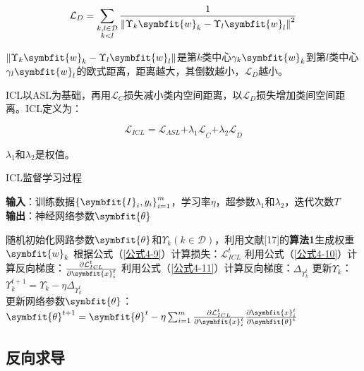 \begin{equation}\label{公式4-8}
	\mathcal{L}_{D}=\sum_{\substack{k, l \in \mathcal{D} \\ k<l}} \frac{1}{\left\|\Upsilon_{k} \symbfit{w}_{k}-\Upsilon_{l} \symbfit{w}_{l}\right\|^{2}}
\end{equation}

$\left\|\Upsilon_{k} \symbfit{w}_{k}-\Upsilon_{l} \symbfit{w}_{l}\right\|$是第$k$类中心$\gamma_{k} \symbfit{w}_{k}$到第$l$类中心$\gamma_{l} \symbfit{w}_{l}$的欧式距离，距离越大，其倒数越小，$\mathcal{L}_D$越小。


ICL以ASL为基础，再用$\mathcal{L}_C$损失减小类内空间距离，以$\mathcal{L}_D$损失增加类间空间距离。ICL定义为：

\begin{equation}\label{公式4-9}
	\mathcal{L}_{ICL}=\mathcal{L}_{ASL}{+\lambda_1\mathcal{L}}_C{+\lambda_2\mathcal{L}}_D
\end{equation}

$\lambda_1$和$\lambda_2$是权值。

\begin{algorithm}
	\caption{ICL监督学习过程}\label{algorithm}
	\textbf{输入}：训练数据$\left\{\symbfit{I}_i,y_i\right\}_{i=1}^m$，学习率$\eta$，超参数$\lambda_1$和$\lambda_2$，迭代次数$T$ \\		
	\textbf{输出}：神经网络参数$\symbfit{\theta}$ 
	\begin{algorithmic}[1]
		\State 随机初始化网路参数$\symbfit{\theta}$和$\Upsilon_k\left(k\in\mathcal{D}\right)$，利用文献[17]的\textbf{算法1}生成权重$\symbfit{w}_k$ 		
		\State 根据公式（\ref{公式4-9}）计算损失：$\mathcal{L}_{ICL}^t$ 		
		\State 利用公式（\ref{公式4-10}）计算反向梯度：$\frac{\partial\mathcal{L}_{ICL}^t}{\partial\symbfit{x}_i^t}$ 
		\State 利用公式（\ref{公式4-11}）计算反向梯度：$ \Delta_{\Upsilon_{k}^{t}} $
		\State 更新$\Upsilon_k$：
		$ 
		\Upsilon_{k}^{t+1}=\Upsilon_{k}-\eta \Delta_{\Upsilon_{k}^{t}}
		$		\\
		\State 更新网络参数$\symbfit{\theta}$：
		$\symbfit{\theta}^{t+1}=\symbfit{\theta}^t-\eta\sum_{i=1}^{m}{\frac{\partial\mathcal{L}_{ICL}^t}{\partial\symbfit{x}_i^t}\frac{\partial\symbfit{x}_i^t}{\partial\symbfit{\theta}^t}} 
		$ \\		
		\EndFor	
	\end{algorithmic}
\end{algorithm}


\subsection{反向求导}

